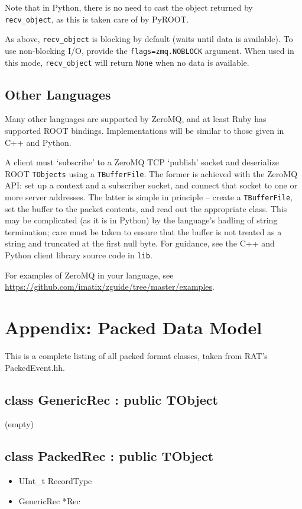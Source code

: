 \documentclass{article}
\begin{document}
Note that in Python, there is no need to cast the object returned by {\tt recv\_object}, as this is taken care of by PyROOT.

As above, {\tt recv\_object} is blocking by default (waits until data is available). To use non-blocking I/O, provide the {\tt flags=zmq.NOBLOCK} argument. When used in this mode, {\tt recv\_object} will return {\tt None} when no data is available.

\subsection{Other Languages}

Many other languages are supported by ZeroMQ, and at least Ruby has supported ROOT bindings. Implementations will be similar to those given in C++ and Python. 

A client must `subscribe' to a ZeroMQ TCP `publish' socket and deserialize ROOT {\tt TObjects} using a {\tt TBufferFile}. The former is achieved with the ZeroMQ API: set up a context and a subscriber socket, and connect that socket to one or more server addresses. The latter is simple in principle -- create a {\tt TBufferFile}, set the buffer to the packet contents, and read out the appropriate class. This may be complicated (as it is in Python) by the language's hadling of string termination; care must be taken to ensure that the buffer is not treated as a string and truncated at the first null byte. For guidance, see the C++ and Python client library source code in {\tt lib}.

For examples of ZeroMQ in your language, see \href{https://github.com/imatix/zguide/tree/master/examples}{https://github.com/imatix/zguide/tree/master/examples}.

\clearpage
\section{Appendix: Packed Data Model}
This is a complete listing of all packed format classes, taken from RAT's PackedEvent.hh.

\subsection{class GenericRec : public TObject}
(empty)

\subsection{class PackedRec : public TObject}
\begin{itemize}
\item UInt\_t RecordType
\item GenericRec *Rec
\end{itemize}
\end{document}
